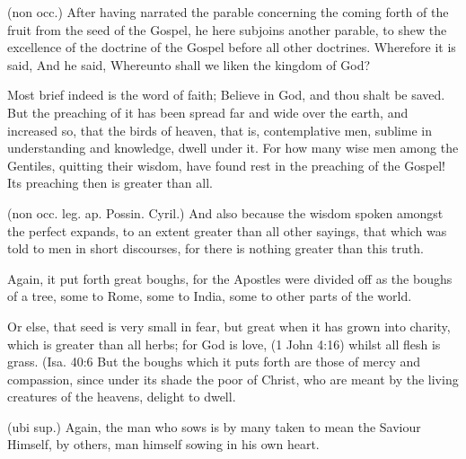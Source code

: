  

 (non occ.) After having narrated the parable concerning the coming forth of the fruit from the seed of the Gospel, he here subjoins another parable, to shew the excellence of the doctrine of the Gospel before all other doctrines. Wherefore it is said, And he said, Whereunto shall we liken the kingdom of God?

 Most brief indeed is the word of faith; Believe in God, and thou shalt be saved. But the preaching of it has been spread far and wide over the earth, and increased so, that the birds of heaven, that is, contemplative men, sublime in understanding and knowledge, dwell under it. For how many wise men among the Gentiles, quitting their wisdom, have found rest in the preaching of the Gospel! Its preaching then is greater than all.

 (non occ. leg. ap. Possin. Cyril.) And also because the wisdom spoken amongst the perfect expands, to an extent greater than all other sayings, that which was told to men in short discourses, for there is nothing greater than this truth.

 Again, it put forth great boughs, for the Apostles were divided off as the boughs of a tree, some to Rome, some to India, some to other parts of the world.

 Or else, that seed is very small in fear, but great when it has grown into charity, which is greater than all herbs; for God is love, (1 John 4:16) whilst all flesh is grass. (Isa. 40:6 But the boughs which it puts forth are those of mercy and compassion, since under its shade the poor of Christ, who are meant by the living creatures of the heavens, delight to dwell.

 (ubi sup.) Again, the man who sows is by many taken to mean the Saviour Himself, by others, man himself sowing in his own heart.

